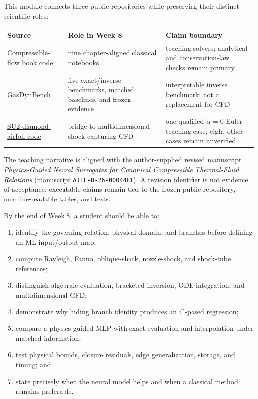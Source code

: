 \documentclass[11pt]{article}
\begin{document}
This module connects three public repositories while preserving their distinct
scientific roles:
\begin{center}
\begin{tabular}{p{}p{}p{}}
\toprule
Source & Role in Week 8 & Claim boundary \\
\midrule
\href{https://github.com/Ehsan-Roohi/Introduction-to-Compressible-Flows}{Compressible-flow book code} & nine chapter-aligned classical notebooks & teaching solvers; analytical and conservation-law checks remain primary \\
\href{https://github.com/Ehsan-Roohi/GasDynamicsSciML}{GasDynBench} & five exact/inverse benchmarks, matched baselines, and frozen evidence & interpretable inverse benchmark; not a replacement for CFD \\
\href{https://github.com/Ehsan-Roohi/SU2-Diamond-Airfoil-Verification}{SU2 diamond-airfoil code} & bridge to multidimensional shock-capturing CFD & one qualified $\alpha=0$ Euler teaching case; eight other cases remain unverified \\
\bottomrule
\end{tabular}
\end{center}

The teaching narrative is aligned with the author-supplied revised manuscript
\emph{Physics-Guided Neural Surrogates for Canonical Compressible Thermal-Fluid
Relations} (manuscript \texttt{AITF-D-26-00044R1}). A revision identifier is
not evidence of acceptance; executable claims remain tied to the frozen public
repository, machine-readable tables, and tests.

\begin{learningbox}
By the end of Week 8, a student should be able to:
\begin{enumerate}
\item identify the governing relation, physical domain, and branches before defining an ML input/output map;
\item compute Rayleigh, Fanno, oblique-shock, nozzle-shock, and shock-tube references;
\item distinguish algebraic evaluation, bracketed inversion, ODE integration, and multidimensional CFD;
\item demonstrate why hiding branch identity produces an ill-posed regression;
\item compare a physics-guided MLP with exact evaluation and interpolation under matched information;
\item test physical bounds, closure residuals, edge generalization, storage, and timing; and
\item state precisely when the neural model helps and when a classical method remains preferable.
\end{enumerate}
\end{learningbox}
\end{document}
